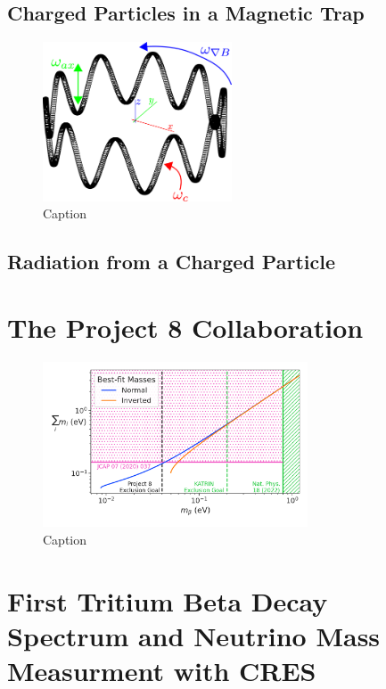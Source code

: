 \subsection{Charged Particles in a Magnetic Trap}

\begin{figure}[htbp]
    \centering
    \includegraphics[width=0.5\textwidth]{figs/Chapter-3/230511_trapped_motion.png}
    \caption{Caption}
    \label{fig:chap3-trapped-electron-motion}
\end{figure}

\subsection{Radiation from a Charged Particle}

\section{The Project 8 Collaboration}

\begin{figure}[htbp]
    \centering
    \includegraphics[width=0.7\textwidth]{figs/Chapter-3/230303_sum_nu_mass_vs_m_beta_with_exclusion_and_goal.png}
    \caption{Caption}
    \label{fig:p8_nu_mass_goal}
\end{figure}

\section{First Tritium Beta Decay Spectrum and Neutrino Mass Measurment with CRES}


